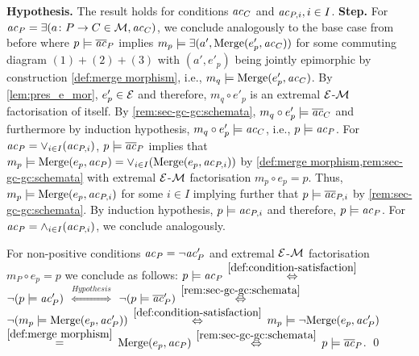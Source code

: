 \begin{description}
    \textbf{Hypothesis.}
    The result holds for conditions $\mathit{ac}_C$ and $\mathit{ac}_{P,i},i \in I$.
    \textbf{Step.}
    For $\mathit{ac}_P=\exists(a\colon P \to C \in {\cal M},\mathit{ac}_C)$, we conclude analogously to the base case from before where $p \models \overline{\mathit{ac}}_P$ implies $m_p \models \exists(a',\mathrm{Merge}(e'_p,\mathit{ac}_C))$ for some commuting diagram $(1)+(2)+(3)$ with $(a',e'_p)$ being jointly epimorphic by construction \cref{def:merge morphism}, i.e., $m_q \models \mathrm{Merge}(e'_p,\mathit{ac}_C)$.
    By \cref{lem:pres_e_mor}, $e'_p \in \mathcal{E}$ and therefore, $m_q \circ e'_p$ is an extremal $\mathcal{E}$-${\cal M}$ factorisation of itself.
    By \cref{rem:sec-gc-gc:schemata}, $m_q \circ e'_p \models \overline{\mathit{ac}}_C$ and furthermore by induction hypothesis, $m_q \circ e'_p \models \mathit{ac}_C$, i.e., $p \models \mathit{ac}_P$.
    For $\mathit{ac}_P=\vee_{i \in I}(\mathit{ac}_{P,i})$, $p \models \overline{\mathit{ac}}_P$ implies that $m_p \models \mathrm{Merge}(e_p,\mathit{ac}_P)=\vee_{i \in I}(\mathrm{Merge}(e_p,\mathit{ac}_{P,i}))$ by \cref{def:merge morphism,rem:sec-gc-gc:schemata} with extremal $\mathcal{E}$-${\cal M}$ factorisation $m_p \circ e_p=p$.
    Thus, $m_p \models \mathrm{Merge}(e_p,\mathit{ac}_{P,i})$ for some $i \in I$ implying further that $p \models \overline{\mathit{ac}}_{P,i}$ by \cref{rem:sec-gc-gc:schemata}.
    By induction hypothesis, $p \models \mathit{ac}_{P,i}$ and therefore, $p \models \mathit{ac}_P$.
    For $\mathit{ac}_P=\wedge_{i \in I}(\mathit{ac}_{P,i})$, we conclude analogously.
\end{description}
For non-positive conditions $\mathit{ac}_P=\neg \mathit{ac}'_P$ and extremal $\mathcal{E}$-${\cal M}$ factorisation $m_P \circ e_p=p$ we conclude as follows:
$p \models \mathit{ac}_P$ $\stackrel{\cref{def:condition-satisfaction}}{\Leftrightarrow}$ $\neg(p \models \mathit{ac}'_P)$ $\stackrel{Hypothesis}{\Leftrightarrow}$ $\neg(p \models \overline{\mathit{ac}}'_P)$ $\stackrel{\cref{rem:sec-gc-gc:schemata}}{\Leftrightarrow}$ $\neg(m_p \models \mathrm{Merge}(e_p,\mathit{ac}'_P))$ $\stackrel{\cref{def:condition-satisfaction}}{\Leftrightarrow}$ $m_p \models \neg\mathrm{Merge}(e_p,\mathit{ac}'_P)$ $\stackrel{\cref{def:merge morphism}}{=}$ $\mathrm{Merge}(e_p,\mathit{ac}_P)$ $\stackrel{\cref{rem:sec-gc-gc:schemata}}{\Leftrightarrow}$ $p \models \overline{\mathit{ac}}_P$.
\qed

